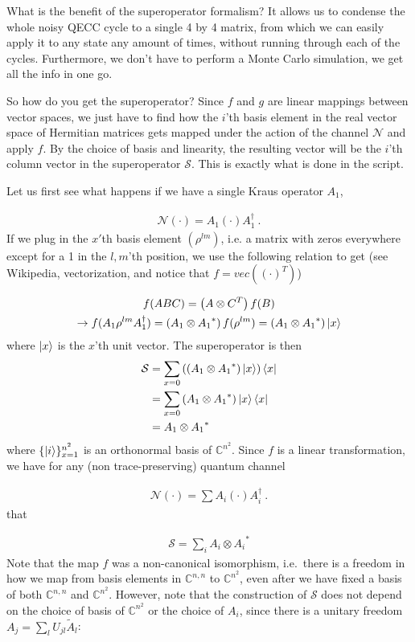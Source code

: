 \documentclass[twoside]{article}
\newcommand{\N}{\mathcal N}
\begin{document}
What is the benefit of the superoperator formalism? It allows us to condense the whole noisy QECC cycle to a single 4 by 4 matrix, from which we can easily apply it to any state any amount of times, without running through 	each of the cycles. Furthermore, we don't have to perform a Monte Carlo simulation, we get all the info in one go.

So how do you get the superoperator? Since $f$ and $g$ are linear mappings between vector spaces, we just have to find how the $i$'th basis element in the real vector space of Hermitian matrices gets mapped under the action of the channel $\N$ and apply $f$. By the choice of basis and linearity, the resulting vector will be the $i$'th column vector in the superoperator $\mathcal{S}$. This is exactly what is done in the script.

Let us first see what happens if we have a single Kraus operator $A_1$,

\begin{align}
\N(\cdot) = A_1(\cdot)A_1^{\dag}\ .
\end{align}
If we plug in the $x'$th basis element $\left(\rho^{lm}\right)$, i.e. a matrix with zeros everywhere except for a 1 in the $l,m$'th position, we use the following relation to get (see Wikipedia, vectorization, and notice that $f = vec\left((\cdot)^T\right)$)

\begin{gather}
f(ABC) = \left(A\otimes C^T\right)f(B)\\
\rightarrow f(A_1\rho^{lm}A_1^{\dag}) = \left(A_1\otimes {A_1}^*\right)f(\rho^{lm}) = \left(A_1\otimes {A_1} ^*\right)\Ket{x}
\end{gather}
where $\Ket{x}$ is the $x$'th unit vector.
The superoperator is then
\begin{align}
\mathcal{S} &= \sum_{x = 0}\left(\left(A_1\otimes {A_1}^*\right)\Ket{x}\right)\Bra{x}\\
&= \sum_{x = 0}\left(A_1\otimes {A_1}^*\right)\Ket{x}\Bra{x}\\
&= A_1\otimes {A_1}^*
\end{align}
where $\lbrace\Ket{i}\rbrace_{x=1}^{n^2}$ is an orthonormal basis of $\mathbb{C}^{n^2}$. Since $f$ is a linear transformation, we have for any (non trace-preserving) quantum channel  

\begin{align}
\N(\cdot) =\sum A_i(\cdot)A_i^{\dag}\ .
\end{align}
that 

\begin{align}
\mathcal{S} = \sum_{i}A_i\otimes {A_i}^*
\end{align}
Note that the map $f$ was a non-canonical isomorphism, i.e.~there is a freedom in how we map from basis elements in $\mathbb{C}^{n,n}$ to $\mathbb{C}^{n^2}$, even after we have fixed a basis of both $\mathbb{C}^{n,n}$ and $\mathbb{C}^{n^2}$. However, note that the construction of $\mathcal{S}$ does not depend on the choice of basis of $\mathbb{C}^{n^2}$ or the choice of $A_i$, since there is a unitary freedom $A_j = \sum_{l}U_{jl}\tilde{A}_l$:
\end{document}
